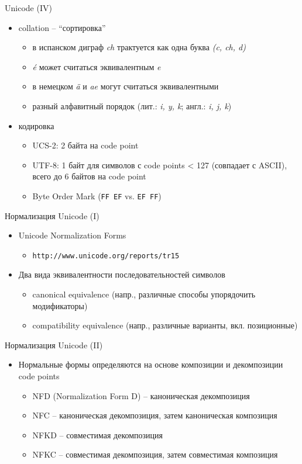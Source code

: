 \documentclass{beamer}
\begin{document}
\begin{frame}{Unicode (IV)}
\begin{itemize}
\item collation -- ``сортировка''
\begin{itemize}
\item в испанском диграф \textit{ch} трактуется как одна буква \textit{(c, ch, d)}
\item \textit{\'{e}} может считаться эквивалентным \textit{e}
\item в немецком \textit{\"{a}} и \textit{ae} могут считаться эквивалентными
\item разный алфавитный порядок (лит.: \textit{i, y, k}; англ.: \textit{i, j, k})
\end{itemize}	
\medskip
\item кодировка
\begin{itemize}
\item UCS-2: 2 байта на code point 
\item UTF-8: 1 байт для символов с code points < 127 (совпадает с ASCII), всего до 6 байтов на code point
\item Byte Order Mark (\texttt{FF\,EF} vs. \texttt{EF\,FF})
\end{itemize}	
\end{itemize}
\end{frame}

\begin{frame}{Нормализация Unicode (I)}
\begin{itemize}
\item Unicode Normalization Forms 
\begin{itemize}
\item \texttt{http://www.unicode.org/reports/tr15}
\end{itemize} 
\medskip
\item Два вида эквивалентности последовательностей символов
\begin{itemize}
\item canonical equivalence (напр., различные способы упорядочить модификаторы)
\item compatibility equivalence (напр., различные варианты, вкл. позиционные)
\end{itemize} 
\end{itemize}
\end{frame}

\begin{frame}{Нормализация Unicode (II)}
\begin{itemize}
\item Нормальные формы определяются на основе композиции и декомпозиции code points
\begin{itemize}
\item NFD (Normalization Form D) -- каноническая декомпозиция
\item NFC -- каноническая декомпозиция, затем каноническая композиция
\item NFKD -- совместимая декомпозиция
\item NFKC -- совместимая декомпозиция, затем совместимая композиция
\end{itemize} 
\end{itemize}
\end{frame}
\end{document}
